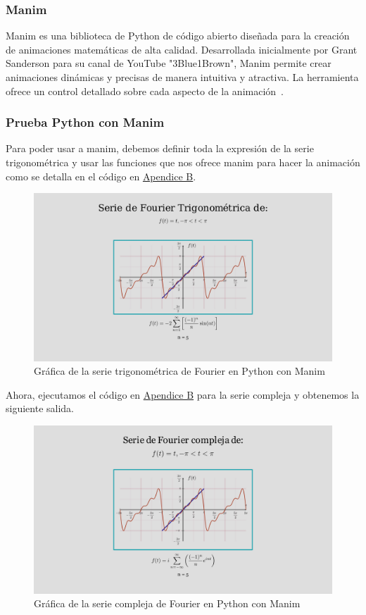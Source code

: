 \subsubsection{Manim}
Manim es una biblioteca de Python de código abierto diseñada para la creación de animaciones matemáticas de alta calidad. Desarrollada inicialmente por Grant Sanderson para su canal de YouTube "3Blue1Brown", Manim permite crear animaciones dinámicas y precisas de manera intuitiva y atractiva. La herramienta ofrece un control detallado sobre cada aspecto de la animación~\cite{Manim2024}.
\subsubsection{Prueba Python con Manim}
Para poder usar a manim, debemos definir toda la expresión de la serie trigonométrica y usar las funciones que nos ofrece manim para hacer la animación como se detalla en el código en \hyperref[app2:trig-code-python-manim]{Apendice B}.
\begin{figure}[H]
	\centering
	\includegraphics[width=1\textwidth]{img/chapter02/manim-trig-series-graph.jpg}
	\caption{Gráfica de la serie trigonométrica de Fourier en Python con Manim}
	\label{fig:python-manim-trig-series}  %
\end{figure}
Ahora, ejecutamos el código en \hyperref[app2:complex-code-python-manim]{Apendice B} para la serie compleja y obtenemos la siguiente salida.
\begin{figure}[H]
	\centering
	\includegraphics[width=1\textwidth]{img/chapter02/manim-complex-series-graph.jpg}
	\caption{Gráfica de la serie compleja de Fourier en Python con Manim}
	\label{fig:python-manim-complex-series}  %
\end{figure}
